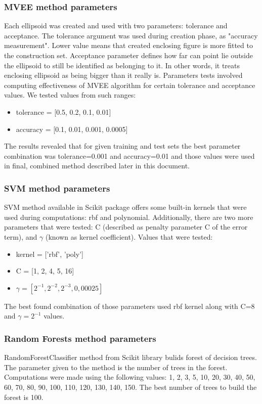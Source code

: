 \documentclass{llncs}
\begin{document}
\subsubsection{MVEE method parameters}
Each ellipsoid was created and used with two parameters: tolerance and acceptance. The tolerance argument was used during creation phase, as "accuracy measurement". Lower value means that created enclosing figure is more fitted to the construction set. Acceptance parameter defines how far can point lie outside the ellipsoid to still be identified as belonging to it. In other words, it treats enclosing ellipsoid as being bigger than it really is.
Parameters tests involved computing effectiveness of MVEE algorithm for certain tolerance and acceptance values. We tested values from such ranges:
\begin{itemize}
	\item tolerance = [0.5, 0.2, 0.1, 0.01]
	\item accuracy = [0.1, 0.01, 0.001, 0.0005]
\end{itemize} 
The results revealed that for given training and test sets the best parameter combination was tolerance=0.001 and accuracy=0.01 and those values were used in final, combined method described later in this document.

\subsubsection{SVM method parameters}
SVM method available in Scikit package offers some built-in kernels that were used during computations: rbf and polynomial. Additionally, there are two more parameters that were tested: C (described as penalty parameter C of the error term), and $\gamma$ (known as kernel coefficient). Values that were tested:
\begin{itemize}
	\item kernel = ['rbf', 'poly']
	\item C = [1, 2, 4, 5, 16]
	\item $\gamma = [2^{-1}, 2^{-2}, 2^{-3}, 0,00025]$
\end{itemize}
The best found combination of those parameters used rbf kernel along with C=8 and $\gamma = 2^{-1}$ values.

\subsubsection{Random Forests method parameters}
RandomForestClassifier method from Scikit library bulids forest of decision trees. The parameter given to the method is the number of trees in the forest. Computations were made using the following values: 1, 2, 3, 5, 10, 20, 30, 40, 50, 60, 70, 80, 90, 100, 110, 120, 130, 140, 150. The best number of trees to build the forest is 100.
\end{document}
